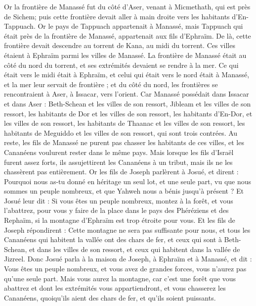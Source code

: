 \begin{multicols}{2}
Or la frontière de Manassé fut du côté d'Aser, venant à Micmethath, qui est près de Sichem; puis cette frontière devait aller à main droite vers les habitants d'En-Tappuach.
Or le pays de Tappuach appartenait à Manassé, mais Tappuach qui était près de la frontière de Manassé, appartenait aux fils d'Ephraïm.
De là, cette frontière devait descendre au torrent de Kana, au midi du torrent. Ces villes étaient à Ephraïm parmi les villes de Manassé. La frontière de Manassé était au côté du nord du torrent, et ses extrémités devaient se rendre à la mer.
Ce qui était vers le midi était à Ephraïm, et celui qui était vers le nord était à Manassé, et la mer leur servait de frontière ; et du côté du nord, les frontières se rencontraient à Aser, à Issacar, vers l'orient.
Car Manassé possédait dans Issacar et dans Aser : Beth-Schean et les villes de son ressort, Jibleam et les villes de son ressort, les habitants de Dor et les villes de son ressort, les habitants d'En-Dor, et les villes de son ressort, les habitants de Thaanac et les villes de son ressort, les habitants de Meguiddo et les villes de son ressort, qui sont trois contrées.
Au reste, les fils de Manassé ne purent pas chasser les habitants de ces villes, et les Cananéens voulurent rester dans le même pays.
Mais lorsque les fils d'Israël furent assez forts, ils assujettirent les Cananéens à un tribut, mais ils ne les chassèrent pas entièrement.
Or les fils de Joseph parlèrent à Josué, et dirent : Pourquoi nous as-tu donné en héritage un seul lot, et une seule part, vu que nous sommes un peuple nombreux, et que Yahweh nous a bénis jusqu'à présent ?
Et Josué leur dit : Si vous êtes un peuple nombreux, montez à la forêt, et vous l'abattrez, pour vous y faire de la place dans le pays des Phéréziens et des Rephaïm, si la montagne d'Ephraïm est trop étroite pour vous.
Et les fils de Joseph répondirent : Cette montagne ne sera pas suffisante pour nous, et tous les Cananéens qui habitent la vallée ont des chars de fer, et ceux qui sont à Beth-Schean, et dans les villes de son ressort, et ceux qui habitent dans la vallée de Jizreel.
Donc Josué parla à la maison de Joseph, à Ephraïm et à Manassé, et dit : Vous êtes un peuple nombreux, et vous avez de grandes forces, vous n'aurez pas qu'une seule part.
Mais vous aurez la montagne, car c'est une forêt que vous abattrez et dont les extrémités vous appartiendront, et vous chasserez les Cananéens, quoiqu'ils aient des chars de fer, et qu'ils soient puissants.

\end{multicols}
